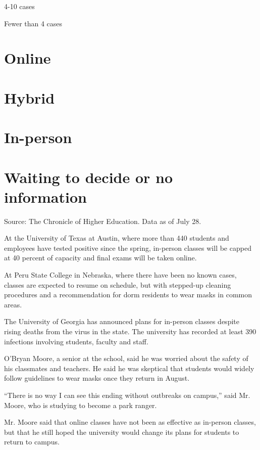 4-10 cases

Fewer than 4 cases

\hypertarget{online}{%
\section{Online}\label{online}}

\hypertarget{hybrid}{%
\section{Hybrid}\label{hybrid}}

\hypertarget{in-person}{%
\section{In-person}\label{in-person}}

\hypertarget{waiting-to-decide-or-no-information}{%
\section{Waiting to decide or no
information}\label{waiting-to-decide-or-no-information}}

Source: The Chronicle of Higher Education. Data as of July 28.

At the University of Texas at Austin, where more than 440 students and
employees have tested positive since the spring, in-person classes will
be capped at 40 percent of capacity and final exams will be taken
online.

At Peru State College in Nebraska, where there have been no known cases,
classes are expected to resume on schedule, but with stepped-up cleaning
procedures and a recommendation for dorm residents to wear masks in
common areas.

The University of Georgia has announced plans for in-person classes
despite rising deaths from the virus in the state. The university has
recorded at least 390 infections involving students, faculty and staff.

O'Bryan Moore, a senior at the school, said he was worried about the
safety of his classmates and teachers. He said he was skeptical that
students would widely follow guidelines to wear masks once they return
in August.

``There is no way I can see this ending without outbreaks on campus,''
said Mr. Moore, who is studying to become a park ranger.

Mr. Moore said that online classes have not been as effective as
in-person classes, but that he still hoped the university would change
its plans for students to return to campus.

